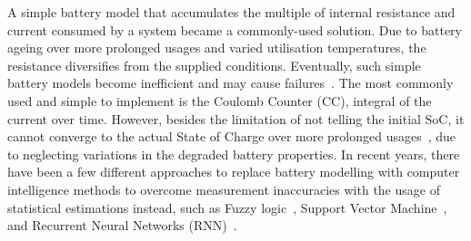 %
%
A simple battery model that accumulates the multiple of internal resistance and current consumed by a system became a commonly-used solution.
Due to battery ageing over more prolonged usages and varied utilisation temperatures, the resistance diversifies from the supplied conditions.
Eventually, such simple battery models become inefficient and may cause failures~\cite{fenrg.2019.00065}.
The most commonly used and simple to implement is the Coulomb Counter (CC), integral of the current over time.
However, besides the limitation of not telling the initial SoC, it cannot converge to the actual State of Charge over more prolonged usages~\cite{ng_enhanced_2009}, due to neglecting variations in the degraded battery properties.
In recent years, there have been a few different approaches to replace battery modelling with computer intelligence methods to overcome measurement inaccuracies with the usage of statistical estimations instead, such as Fuzzy logic~\cite{malkhandi_fuzzy_2006}, Support Vector Machine~\cite{hansen_support_2005, anton_battery_2013}, and Recurrent Neural Networks (RNN)~\cite{song_lithium-ion_2018,Chemali2017,mamo_long_2020,jiao_gru-rnn_2020,xiao_accurate_2019,javid_adaptive_2020,zhang_deep_2020}.

